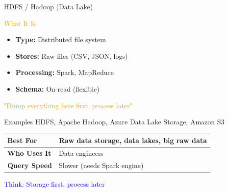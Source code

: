 \documentclass{beamer}
\begin{document}
	\begin{frame}{HDFS / Hadoop (Data Lake)}
		\begin{block}{\textcolor{orange}{What It Is}}
			\begin{itemize}
				\tiny
				\item \textbf{Type:} Distributed file system
				\item \textbf{Stores:} Raw files (CSV, JSON, logs)
				\item \textbf{Processing:} Spark, MapReduce
				\item \textbf{Schema:} On-read (flexible)
			\end{itemize}
		\end{block}
		
		\begin{center}
			\textcolor{orange}{\tiny "Dump everything here first, process later"}
		\end{center}
		
		\begin{example}{Examples}
			\tiny
			HDFS, Apache Hadoop, Azure Data Lake Storage, Amazon S3
		\end{example}
		
		\begin{table}
			\tiny
			\begin{tabular}{|p{}|p{}|}
				\hline
				\textbf{Best For} & Raw data storage, data lakes, big raw data \\
				\hline
				\textbf{Who Uses It} & Data engineers \\
				\hline
				\textbf{Query Speed} & Slower (needs Spark engine) \\
				\hline
			\end{tabular}
		\end{table}
		
		\begin{center}
			\textcolor{blue}{\tiny Think: Storage first, process later}
		\end{center}
	\end{frame}
	
\end{document}
